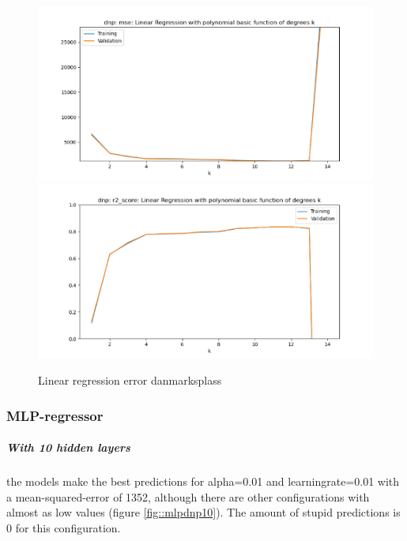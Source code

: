 \documentclass[12pt,a4paper]{scrartcl}		%
\begin{document}
\begin{figure}[h]
    \centering
    \includegraphics[scale = 0.8]{dnp_linreg_mse.png}
    \includegraphics[scale = 0.8]{dnp_linreg_r2.png}
    \caption{Linear regression error danmarksplass}
    \label{fig::linregdnp}
\end{figure}

\subsubsection{MLP-regressor}
\subparagraph{With 10 hidden layers}
the models make the best predictions for alpha=0.01 and learningrate=0.01 with a mean-squared-error of 1352, although there are other configurations with almost as 
low values (figure \ref{fig::mlpdnp10}). The amount of stupid predictions is 0 for this configuration. 
\end{document}
